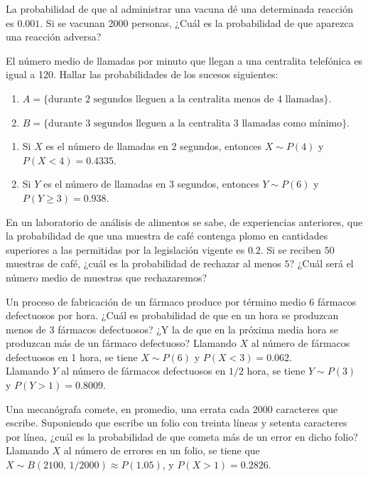 {La probabilidad de que al administrar una vacuna dé una determinada reacción es $0.001$. Si se vacunan 2000 personas, ¿Cuál es la probabilidad de que aparezca una reacción adversa?
}
{}
{}


{El número medio de llamadas por minuto que llegan a una centralita telefónica es igual a 120.
Hallar las probabilidades de los sucesos siguientes: 

\begin{enumerate}
\item  $A=\{\text{durante 2 segundos lleguen a la centralita menos de 4 llamadas}\}$.
\item  $B=\{\text{durante 3 segundos lleguen a la centralita 3 llamadas como mínimo}\}$.
\end{enumerate}
}
{
\begin{enumerate}
\item Si $X$ es el número de llamadas en 2 segundos, entonces $X\sim P(4)$ y $P(X<4)=0.4335$.
\item Si $Y$ es el número de llamadas en 3 segundos, entonces $Y\sim P(6)$ y $P(Y\geq 3)=0.938$.
\end{enumerate}
}
{}


{En un laboratorio de análisis de alimentos se sabe, de experiencias anteriores, que la probabilidad de que una muestra de café contenga plomo en cantidades superiores a las permitidas por la legislación vigente es $0.2$. Si se reciben $50$ muestras de café, ¿cuál es la probabilidad de rechazar al menos $5$?
¿Cuál será el número medio de muestras que rechazaremos?
}
{}
{}


{Un proceso de fabricación de un fármaco produce por término medio 6 fármacos defectuosos por hora.
¿Cuál es probabilidad de que en un hora se produzcan menos de 3 fármacos defectuosos?
¿Y la de que en la próxima media hora se produzcan más de un fármaco defectuoso?}
{Llamando $X$ al número de fármacos defectuosos en 1 hora, se tiene $X\sim P(6)$ y $P(X<3)=0.062$.\\
Llamando $Y$ al número de fármacos defectuosos en $1/2$ hora, se tiene $Y\sim P(3)$ y $P(Y>1)=0.8009$.}
{}


{Una mecanógrafa comete, en promedio, una errata cada 2000 caracteres que escribe.
Suponiendo que escribe un folio con treinta líneas y setenta caracteres por línea, ¿cuál es la probabilidad de que
cometa más de un error en dicho folio?}
{Llamando $X$ al número de errores en un folio, se tiene que $X\sim B(2100,\,1/2000)\approx P(1.05)$, y $P(X>1)=0.2826$.
}
{}


